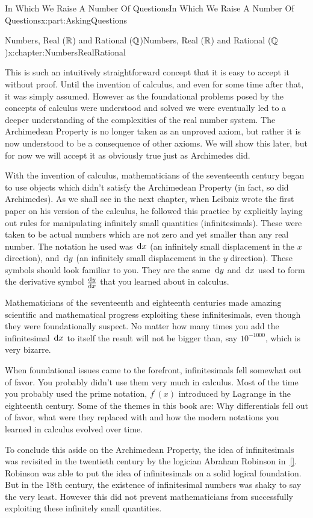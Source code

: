 \begin{partptx}{In Which We Raise A Number Of Questions}{}{In Which We Raise A Number Of Questions}{}{}{x:part:AskingQuestions}
\begin{chapterptx}{Numbers, Real (\(\mathbb {R}\)) and Rational (\(\mathbb {Q}\))}{}{Numbers, Real (\(\mathbb {R}\)) and Rational (\(\mathbb {Q}\))}{}{}{x:chapter:NumbersRealRational}
\begin{introduction}{}
			This is such an intuitively straightforward concept that it is easy to accept it without proof. Until the invention of calculus, and even for some time after that, it was simply assumed. However as the foundational problems posed by the concepts of calculus were understood and solved we were eventually led to a deeper understanding of the complexities of the real number system. The Archimedean Property is no longer taken as an unproved axiom, but rather it is now understood to be a consequence of other axioms. We will show this later, but for now we will accept it as obviously true just as Archimedes did.%
			\par
			With the invention of calculus, mathematicians of the seventeenth century began to use objects which didn't satisfy the Archimedean Property (in fact, so did Archimedes). As we shall see in the next chapter, when Leibniz wrote the first paper on his version of the calculus, he followed this practice by explicitly laying out rules for manipulating infinitely small quantities (infinitesimals). These were taken to be actual numbers which are not zero and yet smaller than any real number. The notation he used was \(\,{\rm d} x\) (an infinitely small displacement in the \(x\) direction), and \(\,{\rm d} y\) (an infinitely small displacement in the \(y\) direction). These symbols should look familiar to you. They are the same \(\,{\rm d} y\) and \(\,{\rm d} x\) used to form the derivative symbol \(\frac{\text{d}{y}}{\text{d}{x}}\) that you learned about in calculus.%
			\par
			Mathematicians of the seventeenth and eighteenth centuries made amazing scientific and mathematical progress exploiting these infinitesimals, even though they were foundationally suspect. No matter how many times you add the infinitesimal \(\,{\rm d} x\) to itself the result will not be bigger than, say \(10^{-1000}\), which is very bizarre.%
			\par
			When foundational issues came to the forefront, infinitesimals fell somewhat out of favor. You probably didn't use them very much in calculus. Most of the time you probably used the prime notation, \(f^\prime(x)\) introduced by Lagrange  in the eighteenth century. Some of the themes in this book are: Why differentials fell out of favor, what were they replaced with and how the modern notations you learned in calculus evolved over time.%
			\par
			To conclude this aside on the Archimedean Property, the idea of infinitesimals was revisited in the twentieth century by the logician Abraham Robinson in~\hyperlink{x:biblio:robinson74__non_stand_analy}{[{}]}. Robinson was able to put the idea of infinitesimals on a solid logical foundation. But in the 18th century, the existence of infinitesimal numbers was shaky to say the very least. However this did not prevent mathematicians from successfully exploiting these infinitely small quantities.%

\end{introduction}
\end{chapterptx}
\end{partptx}
